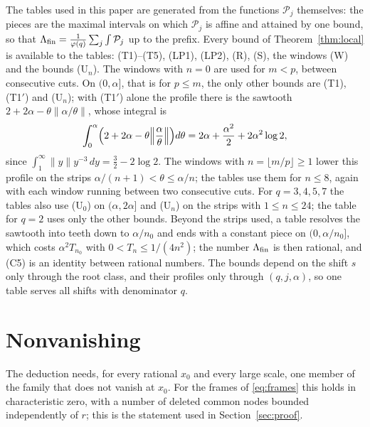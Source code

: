 \documentclass[11pt]{amsart}
\theoremstyle{definition}
\theoremstyle{remark}
\numberwithin{equation}{section}
\begin{document}
The tables used in this paper are generated from the functions $\mathcal P_j$ themselves: the pieces are the maximal
intervals on which $\mathcal P_j$ is affine and attained by one bound, so that
$\Lambda_{\rm fin}=\frac1{\varphi(q)}\sum_j\int\mathcal P_j$ up to the prefix. Every bound of Theorem~\ref{thm:local} is available to the tables: (T1)--(T5), (LP1), (LP2), (R), (S), the
windows (W) and the bounds (U$_n$). The windows with $n=0$ are used for $m<p$, between consecutive cuts. On $(0,\alpha]$, that is for $p\le m$,
the only other bounds are (T1), (T1$'$) and (U$_n$); with (T1$'$) alone the profile there is the sawtooth
$2+2\alpha-\theta\|\alpha/\theta\|$, whose integral is
\[
 \int_0^\alpha\Bigl(2+2\alpha-\theta\Bigl\|\frac\alpha\theta\Bigr\|\Bigr)d\theta=2\alpha+\frac{\alpha^2}2+2\alpha^2\log2,
\]
since $\int_1^\infty\|y\|y^{-3}\,dy=\frac32-2\log2$. The windows with $n=\lfloor m/p\rfloor\ge1$ lower this profile on the
strips $\alpha/(n+1)<\theta\le\alpha/n$; the tables use them for $n\le8$, again with each window running between two
consecutive cuts. For $q=3,4,5,7$ the tables also use (U$_0$) on $(\alpha,2\alpha]$ and (U$_n$) on the strips with
$1\le n\le24$; the table for $q=2$ uses only the other bounds. Beyond the strips used, a table resolves the sawtooth into teeth down to $\alpha/n_0$
and ends with a constant piece on $(0,\alpha/n_0]$, which costs $\alpha^2T_{n_0}$
with $0<T_n\le1/(4n^2)$; the number $\Lambda_{\rm fin}$ is then rational, and (C5) is an identity between rational numbers.
The bounds depend on the shift $s$ only through the root class, and their profiles only through $(q,j,\alpha)$, so one
table serves all shifts with denominator $q$.

\section{Nonvanishing}\label{sec:nonvanishing}

The deduction needs, for every rational $x_0$ and every large scale, one member of the family that does not vanish at
$x_0$. For the frames of \eqref{eq:frames} this holds in characteristic zero, with a number of deleted common nodes
bounded independently of $r$; this is the statement used in Section~\ref{sec:proof}.
\end{document}
